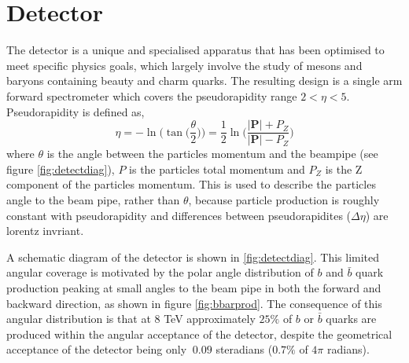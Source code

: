 
\section{Detector}
\label{sec:Detector}

The \lhcb detector is a unique and specialised apparatus that has been optimised to meet specific physics goals, which largely involve the study of mesons and baryons containing beauty and charm quarks.  The resulting design is a single arm forward spectrometer which covers the pseudorapidity range $2 < \eta < 5$.  Pseudorapidity is defined as,
\begin{equation}
   \eta = -\ln \bigg(\tan\big(\frac{\theta}{2}\big)\bigg)=\frac{1}{2}\ln\bigg(\frac{|\textbf{P}|+P_Z}{|\textbf{P}|-P_Z}\bigg)
\end{equation}
 where $\theta$ is the angle between the particles momentum and the beampipe (see figure \ref{fig:detectdiag}), $P$ is the particles total momentum and $P_Z$ is the Z component of the particles momentum.  This is used to describe the particles angle to the beam pipe, rather than $\theta$, because particle production is roughly constant with pseudorapidity and differences between pseudorapidites ($\Delta \eta$) are lorentz invriant.

A schematic diagram of the detector is shown in \ref{fig:detectdiag}.  This limited angular coverage is motivated by the polar angle distribution of  $b$ and $\bar{b}$ quark production peaking at small angles to the beam pipe in both the forward and backward direction, as shown in figure \ref{fig:bbarprod}.  The consequence of this angular distribution is that at 8 TeV approximately $25\%$ of $b$ or $\bar{b}$ quarks are produced within the angular acceptance of the \lhcb detector, despite the geometrical acceptance of the detector being only $~0.09$ steradians ($0.7\%$ of $4\pi$ radians).

